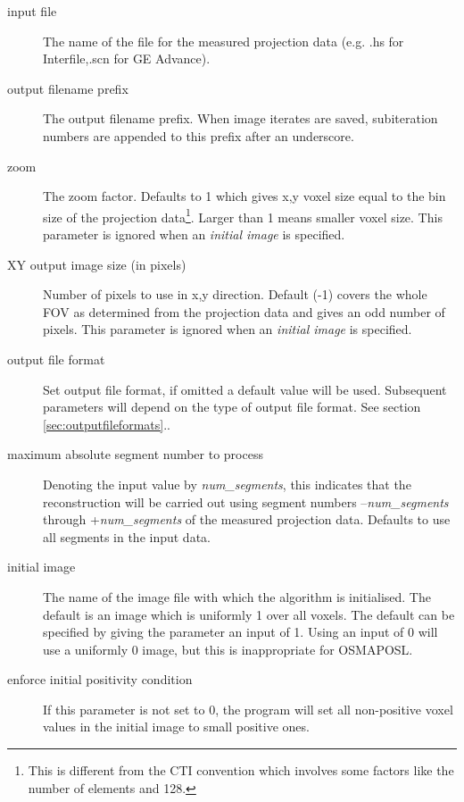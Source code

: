 \documentclass{article}
\begin{document}
\begin{description}
\item[input file]
The name of the file for the measured projection data (e.g. .hs 
for Interfile,.scn for GE Advance). 


\item[output filename prefix]
 The output filename prefix. When image iterates are saved, subiteration 
numbers are appended to this prefix after an underscore.


\item[zoom]
The zoom factor. Defaults to 1 which gives x,y voxel size equal 
to the bin size of the projection data\footnote{{\small This is different 
from the CTI convention which involves some factors like the 
number of elements and 128.}}. Larger than 1 means smaller voxel 
size. This parameter is ignored when an \textit{initial image} is specified.


\item[XY output image size (in pixels)]
Number of pixels to use in x,y direction. Default (-1) covers 
the whole FOV as determined from the projection data and gives 
an odd number of pixels. This parameter is ignored when an \textit{initial 
image} is specified.


\item[output file format]
Set output file format, if omitted a default value will be used. 
Subsequent parameters will depend on the type of output file 
format. See section \ref{sec:outputfileformats}..


\item[maximum absolute segment number to process]
Denoting the input value by \textit{num\_segments}, this indicates 
that the reconstruction will be carried out using segment numbers 
--\textit{num\_segments} through +\textit{num\_segments} of the measured 
projection data. Defaults to use all segments in the input data.


\item[initial image]
The name of the image file with which the algorithm is initialised. 
The default is an image which is uniformly 1 over all voxels. 
The default can be specified by giving the parameter an input 
of 1. Using an input of 0 will use a uniformly 0 image, but this 
is inappropriate for OSMAPOSL.


\item[enforce initial positivity condition]
If this parameter is not set to 0, the program will set all non-positive 
voxel values in the initial image to small positive ones.



\end{description}
\end{document}
